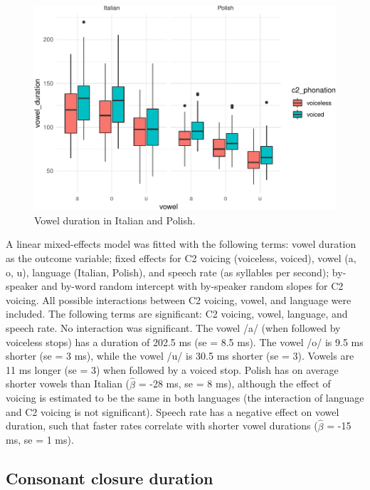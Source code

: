\documentclass[preprint]{JASAnew}
\begin{document}
\begin{figure}
\centering
\includegraphics{2018-jasa_files/figure-latex/vowels-plot-1.pdf}
\caption{Vowel duration in Italian and Polish.}
\end{figure}

A linear mixed-effects model was fitted with the following terms: vowel
duration as the outcome variable; fixed effects for C2 voicing
(voiceless, voiced), vowel (a, o, u), language (Italian, Polish), and
speech rate (as syllables per second); by-speaker and by-word random
intercept with by-speaker random slopes for C2 voicing. All possible
interactions between C2 voicing, vowel, and language were included. The
following terms are significant: C2 voicing, vowel, language, and speech
rate. No interaction was significant. The vowel /a/ (when followed by
voiceless stops) has a duration of 202.5 ms (se = 8.5 ms). The vowel /o/
is 9.5 ms shorter (se = 3 ms), while the vowel /u/ is 30.5 ms shorter
(se = 3). Vowels are 11 ms longer (se = 3) when followed by a voiced
stop. Polish has on average shorter vowels than Italian (\(\hat{\beta}\)
= -28 ms, se = 8 ms), although the effect of voicing is estimated to be
the same in both languages (the interaction of language and C2 voicing
is not significant). Speech rate has a negative effect on vowel
duration, such that faster rates correlate with shorter vowel durations
(\(\hat{\beta}\) = -15 ms, se = 1 ms).

\hypertarget{consonant-closure-duration}{%
\subsection{Consonant closure
duration}\label{consonant-closure-duration}}
\end{document}
